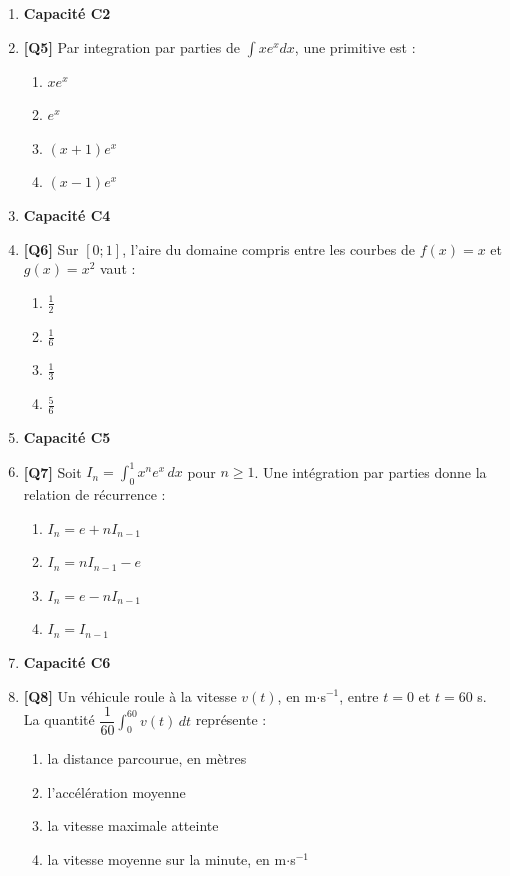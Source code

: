 \begin{enumerate}
\item[] \textbf{Capacité C2}

\item \textbf{[Q5]} Par integration par parties de $\int x e^x dx$, une primitive est :
  \begin{enumerate}[label=\Alph*.]
    \item $x e^x$
    \item $e^x$
    \item $(x+1)e^x$
    \item $(x-1)e^x$
  \end{enumerate}

\item[] \textbf{Capacité C4}

\item \textbf{[Q6]} Sur $[0;1]$, l'aire du domaine compris entre les courbes de $f(x)=x$ et $g(x)=x^2$ vaut :
  \begin{enumerate}[label=\Alph*.]
    \item $\tfrac12$
    \item $\tfrac16$
    \item $\tfrac13$
    \item $\tfrac56$
  \end{enumerate}

\item[] \textbf{Capacité C5}

\item \textbf{[Q7]} Soit $I_n=\displaystyle\int_0^1 x^n e^x\,dx$ pour $n\geq1$. Une intégration par parties donne la relation de récurrence :
  \begin{enumerate}[label=\Alph*.]
    \item $I_n=e+nI_{n-1}$
    \item $I_n=nI_{n-1}-e$
    \item $I_n=e-nI_{n-1}$
    \item $I_n=I_{n-1}$
  \end{enumerate}

\item[] \textbf{Capacité C6}

\item \textbf{[Q8]} Un véhicule roule à la vitesse $v(t)$, en m$\cdot$s$^{-1}$, entre $t=0$ et $t=60$ s. La quantité $\dfrac1{60}\displaystyle\int_0^{60}v(t)\,dt$ représente :
  \begin{enumerate}[label=\Alph*.]
    \item la distance parcourue, en mètres
    \item l'accélération moyenne
    \item la vitesse maximale atteinte
    \item la vitesse moyenne sur la minute, en m$\cdot$s$^{-1}$
  \end{enumerate}


\end{enumerate}
